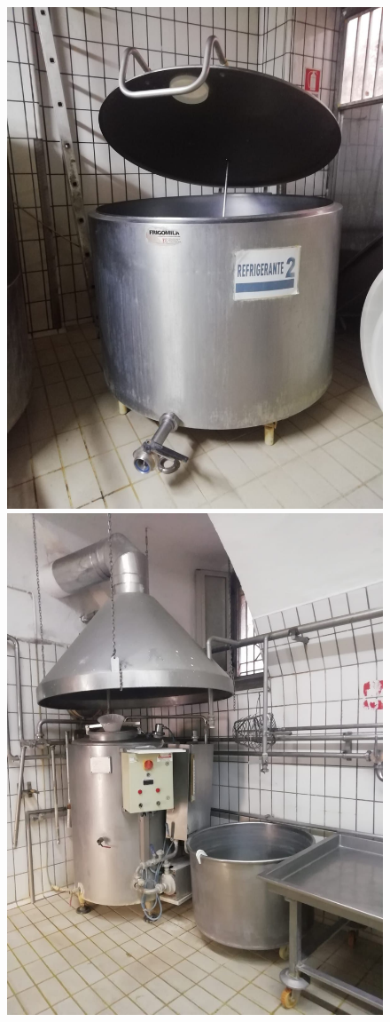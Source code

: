 \documentclass[12pt]{report}
\begin{document}
\begin{figure}[H]
\includegraphics[scale=0.10]{imgs/photos/img3.jpeg}
\includegraphics[scale=0.10]{imgs/photos/img4.jpeg}

\end{figure}
\end{document}

